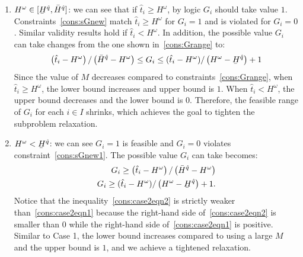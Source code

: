 \documentclass[11pt]{article}
\renewcommand{\underbar}{\underaccent{\bar}}
\begin{document}
	\begin{enumerate}
		\item 
		\(H^\omega \in
		[\underbar{H}^{\hat{q}},\bar{H}^{\hat{q}}]\): 
		we can see that if \(\hat{t}_i \geq H^\omega\), by logic \(G_i\) should take value \(1\). Constraints~\eqref{cons:sGnew} match \(\hat{t}_i \geq H^\omega\) for \(G_i = 1\) and is violated for \(G_i = 0\). Similar validity results hold if \(\hat{t}_i < H^\omega\). In addition, the possible value \(G_i\) can take changes from the one shown in~\eqref{cons:Grange} to:
		\begin{equation}
		\left(\hat{t}_i - H^\omega \right)/\left( \bar{H}^{\hat{q}} - H^\omega \right) \leq G_i \leq (\hat{t}_i - H^\omega)/\left(H^\omega - \underbar{H}^{\hat{q}} \right) + 1 \label{cons:case1}
		\end{equation}
		Since the value of \(M\) decreases compared to constraints~\eqref{cons:Grange}, when \(\hat{t}_i \geq H^\omega\), the lower bound increases and upper bound is \(1\). When \(\hat{t}_i < H^\omega\), the upper bound decreases and the lower bound is \(0\). Therefore, the feasible range of \(G_i\) for each \(i \in I\) shrinks, which achieves the goal to tighten the subproblem relaxation.
		\item 
		\(H^\omega < \underbar{H}^{\hat{q}}\): 
		we can see \(G_i = 1\) is feasible and \(G_i = 0\) violates constraint~\eqref{cons:sGnew1}. The possible value \(G_i\) can take becomes:
		\begin{subequations}
			\begin{align}
			G_i \geq \left(\hat{t}_i - H^\omega \right)/\left( \bar{H}^{\hat{q}} - H^\omega \right) \label{cons:case2eqn1}\\
			G_i \geq (\hat{t}_i - H^\omega)/\left(H^\omega - \underbar{H}^{\hat{q}} \right) + 1. \label{cons:case2eqn2}
			\end{align}
		\end{subequations}
		Notice that the inequality~\eqref{cons:case2eqn2} is strictly weaker than~\eqref{cons:case2eqn1} because the right-hand side of~\eqref{cons:case2eqn2} is smaller than 0 while the right-hand side of~\eqref{cons:case2eqn1} is positive. Similar to Case 1, the lower bound increases compared to using a large \(M\) and the upper bound is \(1\), and we achieve a tightened relaxation.

\end{enumerate}
\end{document}
